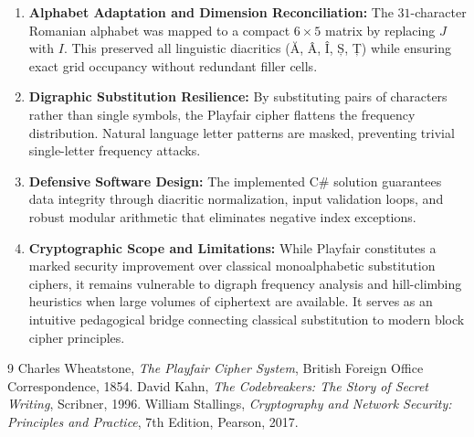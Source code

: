 \documentclass[12pt,a4paper]{article}
\begin{document}
\begin{enumerate}
    \item \textbf{Alphabet Adaptation and Dimension Reconciliation:} The $31$-character Romanian alphabet was mapped to a compact $6 \times 5$ matrix by replacing $J$ with $I$. This preserved all linguistic diacritics (Ă, Â, Î, Ș, Ț) while ensuring exact grid occupancy without redundant filler cells.
    \item \textbf{Digraphic Substitution Resilience:} By substituting pairs of characters rather than single symbols, the Playfair cipher flattens the frequency distribution. Natural language letter patterns are masked, preventing trivial single-letter frequency attacks.
    \item \textbf{Defensive Software Design:} The implemented C\# solution guarantees data integrity through diacritic normalization, input validation loops, and robust modular arithmetic that eliminates negative index exceptions.
    \item \textbf{Cryptographic Scope and Limitations:} While Playfair constitutes a marked security improvement over classical monoalphabetic substitution ciphers, it remains vulnerable to digraph frequency analysis and hill-climbing heuristics when large volumes of ciphertext are available. It serves as an intuitive pedagogical bridge connecting classical substitution to modern block cipher principles.
\end{enumerate}

\begin{thebibliography}{9}
Charles Wheatstone, \textit{The Playfair Cipher System}, British Foreign Office Correspondence, 1854.
David Kahn, \textit{The Codebreakers: The Story of Secret Writing}, Scribner, 1996.
William Stallings, \textit{Cryptography and Network Security: Principles and Practice}, 7th Edition, Pearson, 2017.
\end{thebibliography}
\end{document}
